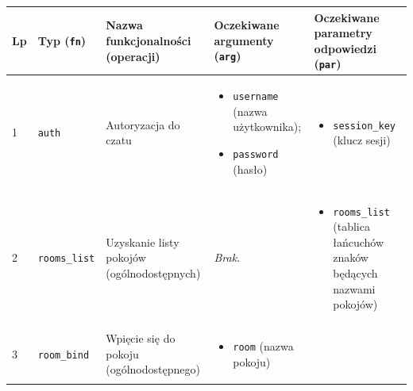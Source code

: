 {\footnotesize
\begin{longtable}{ | l | l | l | l | l | }
\hline
	\textbf{Lp} &
	\textbf{Typ (\texttt{fn})} &
	\parbox{3.9cm}{\textbf{Nazwa funkcjonalności (operacji)}} &
	\parbox{3.9cm}{\textbf{Oczekiwane argumenty (\texttt{arg})}} &
	\parbox{3.9cm}{\textbf{Oczekiwane parametry odpowiedzi (\texttt{par})}}
	\\

	\hline
		\parbox[t]{0.8cm}{
			1

		} & \parbox[t]{1.7cm}{\strut
			\texttt{auth}

		\strut} & \parbox{4.1cm}{
			Autoryzacja do czatu

		} & \parbox{3.9cm}{
			\begin{itemize}
				\item \texttt{username} (nazwa użytkownika);
				\item \texttt{password} (hasło)
			\end{itemize}


		} & \parbox{3.9cm}{
			\begin{itemize}
				\item \texttt{session\_key} (klucz sesji)
			\end{itemize}
		} \\

	\hline

	\parbox[t]{0.8cm}{
		2

	} & \parbox[t]{1.7cm}{\strut
		\texttt{rooms\_list}

	\strut} & \parbox{4.1cm}{
		Uzyskanie listy pokojów (ogólnodostępnych)

	} & \parbox{3.9cm}{
		\textit{Brak.}


	} & \parbox{3.9cm}{
		\begin{itemize}
			\item \texttt{rooms\_list} (tablica łańcuchów znaków będących nazwami pokojów)
		\end{itemize}
	} \\

\hline

\parbox[t]{0.8cm}{
	3

} & \parbox[t]{1.7cm}{\strut
	\texttt{room\_bind}

\strut} & \parbox{4.1cm}{
	Wpięcie się do pokoju (ogólnodostępnego)

} & \parbox{3.9cm}{
	\begin{itemize}
		\item \texttt{room} (nazwa pokoju)
	\end{itemize}


}
\end{longtable}}
